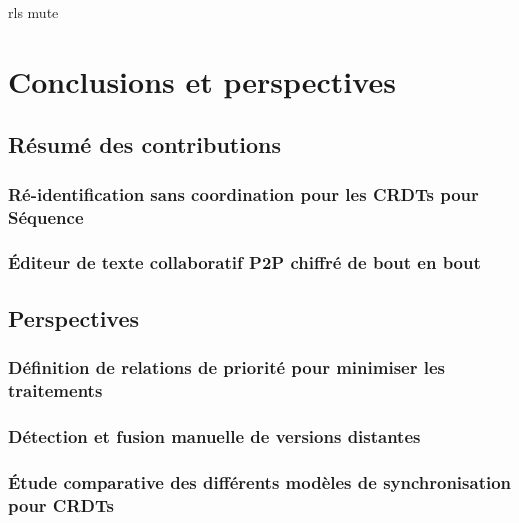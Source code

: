 \documentclass[12pt]{thesul}
\theoremstyle{definition}
\begin{document}
% 


{rls}
{mute}

\NumberThisInToc
\chapter{Conclusions et perspectives}
\minitoc
\section{Résumé des contributions}

\subsection{Ré-identification sans coordination pour les \acp{CRDT} pour Séquence}


\subsection{Éditeur de texte collaboratif \ac{P2P} chiffré de bout en bout}


\section{Perspectives}

\subsection{Définition de relations de priorité pour minimiser les traitements}


\subsection{Détection et fusion manuelle de versions distantes}


\subsection{Étude comparative des différents modèles de synchronisation pour \acp{CRDT}}

\end{document}
